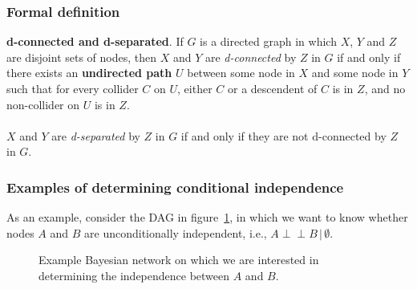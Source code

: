 \documentclass{article}
\newcommand{\indep}{\perp \!\!\! \perp}
\begin{document}
\subsubsection{Formal definition}

\begin{theorem}
    \textbf{d-connected and d-separated}. If $G$ is a directed graph in which $X$, $Y$ and $Z$ are disjoint sets of nodes, then $X$ and $Y$ are \textit{d-connected} by $Z$ in $G$ if and only if there exists an \textbf{undirected path} $U$ between some node in $X$ and some node in $Y$ such that for every collider $C$ on $U$, either $C$ or a descendent of $C$ is in $Z$, and no non-collider on $U$ is in $Z$.
    \\\\
    $X$ and $Y$ are \textit{d-separated} by $Z$ in $G$ if and only if they are not d-connected by $Z$ in $G$.
\end{theorem}

\subsubsection{Examples of determining conditional independence}

\noindent As an example, consider the DAG in figure~\ref{fig:ex_DAG}, in which we want to know whether nodes $A$ and $B$ are unconditionally independent, i.e., $A \indep B \,|\, \emptyset$. 

\begin{figure}[H]
    \centering
    \caption{Example Bayesian network on which we are interested in determining the independence between $A$ and $B$.}
    \label{fig:ex_DAG}
\end{figure}
\end{document}
